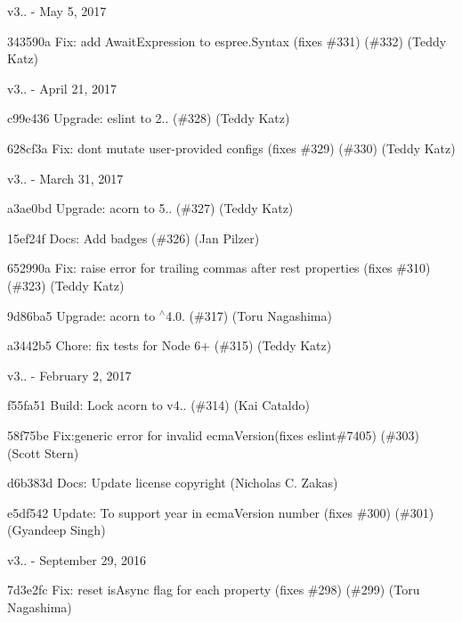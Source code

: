 v3.. -\/ May 5, 2017


\begin{DoxyItemize}
\item 343590a Fix\+: add Await\+Expression to espree.\+Syntax (fixes \#331) (\#332) (Teddy Katz)
\end{DoxyItemize}

v3.. -\/ April 21, 2017


\begin{DoxyItemize}
\item c99e436 Upgrade\+: eslint to 2.. (\#328) (Teddy Katz)
\item 628cf3a Fix\+: don\textquotesingle{}t mutate user-\/provided configs (fixes \#329) (\#330) (Teddy Katz)
\end{DoxyItemize}

v3.. -\/ March 31, 2017


\begin{DoxyItemize}
\item a3ae0bd Upgrade\+: acorn to 5.. (\#327) (Teddy Katz)
\item 15ef24f Docs\+: Add badges (\#326) (Jan Pilzer)
\item 652990a Fix\+: raise error for trailing commas after rest properties (fixes \#310) (\#323) (Teddy Katz)
\item 9d86ba5 Upgrade\+: acorn to \texorpdfstring{$^\wedge$}{\string^}4.0. (\#317) (Toru Nagashima)
\item a3442b5 Chore\+: fix tests for Node 6+ (\#315) (Teddy Katz)
\end{DoxyItemize}

v3.. -\/ February 2, 2017


\begin{DoxyItemize}
\item f55fa51 Build\+: Lock acorn to v4.. (\#314) (Kai Cataldo)
\item 58f75be Fix\+:generic error for invalid ecma\+Version(fixes eslint\#7405) (\#303) (Scott Stern)
\item d6b383d Docs\+: Update license copyright (Nicholas C. Zakas)
\item e5df542 Update\+: To support year in ecma\+Version number (fixes \#300) (\#301) (Gyandeep Singh)
\end{DoxyItemize}

v3.. -\/ September 29, 2016


\begin{DoxyItemize}
\item 7d3e2fc Fix\+: reset {\ttfamily is\+Async} flag for each property (fixes \#298) (\#299) (Toru Nagashima)
\end{DoxyItemize}

